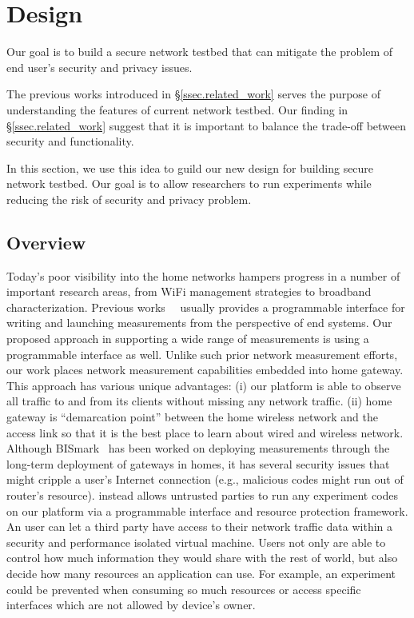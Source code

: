 \chapter{\sysname Design}
\label{sec.design}
Our goal is to build a secure network testbed that can mitigate the problem 
of end user's security and privacy issues. 

The previous works introduced in \S{\ref{ssec.related_work}} serves the 
purpose of understanding the features of current network testbed. Our 
finding in \S{\ref{ssec.related_work}} suggest that it is important to 
balance the trade-off between security and functionality.

In this section, we use this idea to guild our new design for building 
secure network testbed. Our goal is to allow researchers to run experiments 
while reducing the risk of security and privacy problem.

\section{Overview}
Today's poor visibility into the home networks hampers progress in a number of important research areas, from WiFi management strategies to broadband characterization. Previous works~\cite{sanchez2014measurement}~\cite{dhawan2012fathom} usually provides a programmable interface for writing and launching measurements from the perspective of end systems. Our proposed approach in supporting a wide range of measurements is using a programmable interface as well. Unlike such prior network measurement efforts, our work places network measurement capabilities embedded into home gateway. This approach has various unique advantages: (i) our platform is able to observe all traffic to and from its clients without missing any network traffic. (ii) home gateway is ``demarcation point'' between the home wireless network and the access link so that it is the best place to learn about wired and wireless network. Although BISmark~\cite{183951} has been worked on deploying measurements through the long-term deployment of gateways in homes, it has several security issues that might cripple a user's Internet connection (e.g., malicious codes might run out of router's resource). \sysname instead allows untrusted parties to run any experiment codes on our platform via a programmable interface and resource protection framework. An user can let a third party have access to their network traffic data within a security and performance isolated virtual machine. Users not only are able to control how much information they would share with the rest of world, but also decide how many resources an application can use. For example, an experiment could be prevented when consuming so much resources or access specific interfaces which are not allowed by device's owner. 


